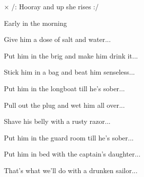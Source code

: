 

\zs
{}



  
\ks

× /: Hooray and up she rises :/

Early in the morning
\kr

\zs
Give him a dose of salt and water...
\ks

\zs
Put him in the brig and make him drink it...
\ks

\zs
Stick him in a bag and beat him senseless...
\ks

\zs
Put him in the longboat till he's sober...
\ks

\zs
Pull out the plug and wet him all over...
\ks

\zs
Shave his belly with a rusty razor...
\ks

\zs
Put him in the guard room till he's sober...
\ks

\zs
Put him in bed with the captain's daughter...
\ks

\zs
That's what we'll do with a drunken sailor...
\ks

\kp
